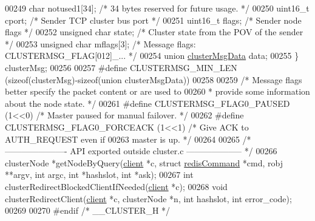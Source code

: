 \begin{DoxyCode}
00249     \textcolor{keywordtype}{char} notused1[34];  \textcolor{comment}{/* 34 bytes reserved for future usage. */}
00250     uint16\_t cport;      \textcolor{comment}{/* Sender TCP cluster bus port */}
00251     uint16\_t flags;      \textcolor{comment}{/* Sender node flags */}
00252     \textcolor{keywordtype}{unsigned} \textcolor{keywordtype}{char} state; \textcolor{comment}{/* Cluster state from the POV of the sender */}
00253     \textcolor{keywordtype}{unsigned} \textcolor{keywordtype}{char} mflags[3]; \textcolor{comment}{/* Message flags: CLUSTERMSG\_FLAG[012]\_... */}
00254     \textcolor{keyword}{union} \hyperlink{unionclusterMsgData}{clusterMsgData} data;
00255 \} clusterMsg;
00256 
00257 \textcolor{preprocessor}{#}\textcolor{preprocessor}{define} \textcolor{preprocessor}{CLUSTERMSG\_MIN\_LEN} \textcolor{preprocessor}{(}\textcolor{keyword}{sizeof}\textcolor{preprocessor}{(}\textcolor{preprocessor}{clusterMsg}\textcolor{preprocessor}{)}\textcolor{preprocessor}{-}\textcolor{keyword}{sizeof}\textcolor{preprocessor}{(}\textcolor{keyword}{union} \textcolor{preprocessor}{clusterMsgData}\textcolor{preprocessor}{)}\textcolor{preprocessor}{)}
00258 
00259 \textcolor{comment}{/* Message flags better specify the packet content or are used to}
00260 \textcolor{comment}{ * provide some information about the node state. */}
00261 \textcolor{preprocessor}{#}\textcolor{preprocessor}{define} \textcolor{preprocessor}{CLUSTERMSG\_FLAG0\_PAUSED} \textcolor{preprocessor}{(}1\textcolor{preprocessor}{<<}0\textcolor{preprocessor}{)} \textcolor{comment}{/* Master paused for manual failover. */}
00262 \textcolor{preprocessor}{#}\textcolor{preprocessor}{define} \textcolor{preprocessor}{CLUSTERMSG\_FLAG0\_FORCEACK} \textcolor{preprocessor}{(}1\textcolor{preprocessor}{<<}1\textcolor{preprocessor}{)} \textcolor{comment}{/* Give ACK to AUTH\_REQUEST even if}
00263 \textcolor{comment}{                                            master is up. */}
00264 
00265 \textcolor{comment}{/* ---------------------- API exported outside cluster.c -------------------- */}
00266 clusterNode *getNodeByQuery(\hyperlink{structclient}{client} *c, \textcolor{keyword}{struct} \hyperlink{structredisCommand}{redisCommand} *cmd, robj **argv, \textcolor{keywordtype}{int} 
      argc, \textcolor{keywordtype}{int} *hashslot, \textcolor{keywordtype}{int} *ask);
00267 \textcolor{keywordtype}{int} clusterRedirectBlockedClientIfNeeded(\hyperlink{structclient}{client} *c);
00268 \textcolor{keywordtype}{void} clusterRedirectClient(\hyperlink{structclient}{client} *c, clusterNode *n, \textcolor{keywordtype}{int} hashslot, \textcolor{keywordtype}{int} error\_code);
00269 
00270 \textcolor{preprocessor}{#}\textcolor{preprocessor}{endif} \textcolor{comment}{/* \_\_CLUSTER\_H */}
\end{DoxyCode}
